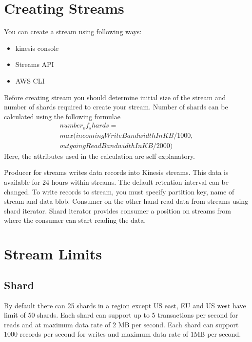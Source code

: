 \documentclass[9pt,twocolumn,twoside]{../../styles/osajnl}
\begin{document}
\section{Creating Streams}
You can create a stream using following ways:
\begin{itemize}
	\item kinesis console
	\item Streams API
	\item AWS CLI
\end{itemize}

Before creating stream you should determine initial size of the stream
\cite{www-kinesis-size} and number of shards required to create your stream.
Number of shards can be calculated using the following formulae
\begin{multline*}
number_of_shards = \\
   max (
   incomingWriteBandwidthInKB/1000, \\
   outgoingReadBandwidthInKB/2000
   )
\end{multline*}
Here, the attributes used in the calculation are self explanatory.

Producer for streams writes data records into Kinesis streams. This data is
available for 24 hours within streams. The default retention interval can be
changed. To write records to stream, you must specify partition key, name of
stream and data blob. Consumer on the other hand read data from streams using
shard iterator. Shard iterator provides consumer a position on streams from
where the consumer can start reading the data.

\section{Stream Limits}
\subsection{Shard}
By default there can 25 shards in a region except US east, EU and US west have
limit of 50 shards. Each shard can support up to 5 transactions per second for
reads and at maximum data rate of 2 MB per second. Each shard can support 1000
records per second for writes and maximum data rate of 1MB per second.
\end{document}
